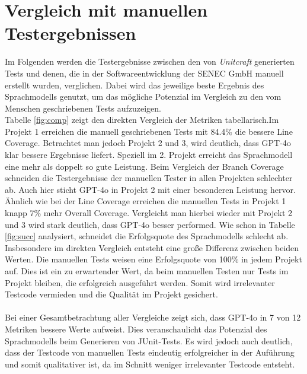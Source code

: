 \section{Vergleich mit manuellen Testergebnissen}
Im Folgenden werden die Testergebnisse zwischen den von \textit{Unitcraft} generierten Tests und denen, die in der Softwareentwicklung der SENEC GmbH manuell erstellt wurden, verglichen. Dabei wird das jeweilige beste Ergebnis des Sprachmodells genutzt, um das mögliche Potenzial im Vergleich zu den vom Menschen geschriebenen Tests aufzuzeigen.\\
Tabelle \ref{fig:comp} zeigt den direkten Vergleich der Metriken tabellarisch.Im Projekt 1 erreichen die manuell geschriebenen Tests mit 84.4\% die bessere Line Coverage. Betrachtet man jedoch Projekt 2 und 3, wird deutlich, dass GPT-4o klar bessere Ergebnisse liefert. Speziell im 2. Projekt erreicht das Sprachmodell eine mehr als doppelt so gute Leistung. Beim Vergleich der Branch Coverage schneiden die Testergebnisse der manuellen Tester in allen Projekten schlechter ab. Auch hier sticht GPT-4o in Projekt 2 mit einer besonderen Leistung hervor. Ähnlich wie bei der Line Coverage erreichen die manuellen Tests in Projekt 1 knapp 7\% mehr Overall Coverage. Vergleicht man hierbei wieder mit Projekt 2 und 3 wird stark deutlich, dass GPT-4o besser performed. Wie schon in Tabelle \ref{fig:succ} analysiert, schneidet die Erfolgsquote des Sprachmodells schlecht ab. Insbesondere im direkten Vergleich entsteht eine große Differenz zwischen beiden Werten. Die manuellen Tests weisen eine Erfolgsquote von 100\% in jedem Projekt auf. Dies ist ein zu erwartender Wert, da beim manuellen Testen nur Tests im Projekt bleiben, die erfolgreich ausgeführt werden. Somit wird irrelevanter Testcode vermieden und die Qualität im Projekt gesichert.\\\\
Bei einer Gesamtbetrachtung aller Vergleiche zeigt sich, dass GPT-4o in 7 von 12 Metriken bessere Werte aufweist. Dies veranschaulicht das Potenzial des Sprachmodells beim Generieren von JUnit-Tests. Es wird jedoch auch deutlich, dass der Testcode von manuellen Tests eindeutig erfolgreicher in der Auführung und somit qualitativer ist, da im Schnitt weniger irrelevanter Testcode entsteht.
